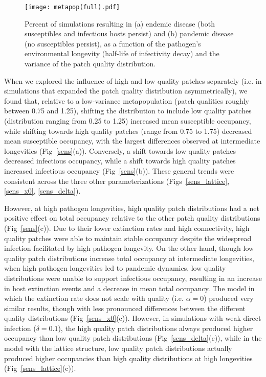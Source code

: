 \documentclass{svjour3}
\begin{document}
\begin{figure}
\centering
\texttt{[image: metapop(full).pdf]}
\caption{Percent of simulations resulting in (a) endemic disease (both susceptibles and infectious hosts persist) and (b) pandemic disease (no susceptibles persist), as a function of the pathogen's environmental longevity (half-life of infectivity decay) and the variance of the patch quality distribution.}
\label{poutcome}
\end{figure}   

When we explored the influence of high and low quality patches separately (i.e. in simulations that expanded the patch quality distribution asymmetrically), we found that, relative to a low-variance metapopulation (patch qualities roughly between 0.75 and 1.25), shifting the distribution to include low quality patches (distribution ranging from 0.25 to 1.25) increased mean susceptible occupancy, while shifting towards high quality patches (range from 0.75 to 1.75) decreased mean susceptible occupancy, with the largest differences observed at intermediate longevities (Fig~\ref{sens}(a)).  Conversely, a shift towards low quality patches decreased infectious occupancy, while a shift towards high quality patches increased infectious occupancy (Fig~\ref{sens}(b)).  These general trends were consistent across the three other parameterizations (Figs~\ref{sens_lattice}, \ref{sens_x0}, \ref{sens_delta}).  

However, at high pathogen longevities, high quality patch distributions had a net positive effect on total occupancy relative to the other patch quality distributions (Fig~\ref{sens}(c)).  Due to their lower extinction rates and high connectivity, high quality patches were able to maintain stable occupancy despite the widespread infection facilitated by high pathogen longevity.  On the other hand, though low quality patch distributions increase total occupancy at intermediate longevities, when high pathogen longevities led to pandemic dynamics, low quality distributions were unable to support infectious occupancy, resulting in an increase in host extinction events and a decrease in mean total occupancy.  The model in which the extinction rate does not scale with quality (i.e. $\alpha = 0$) produced very similar results, though with less pronounced differences between the different quality distributions (Fig~\ref{sens_x0}(c)).  However, in simulations with weak direct infection ($\delta = 0.1$), the high quality patch distributions always produced higher occupancy than low quality patch distributions (Fig~\ref{sens_delta}(c)), while in the model with the lattice structure, low quality patch distributions actually produced higher occupancies than high quality distributions at high longevities (Fig~\ref{sens_lattice}(c)).
\end{document}
